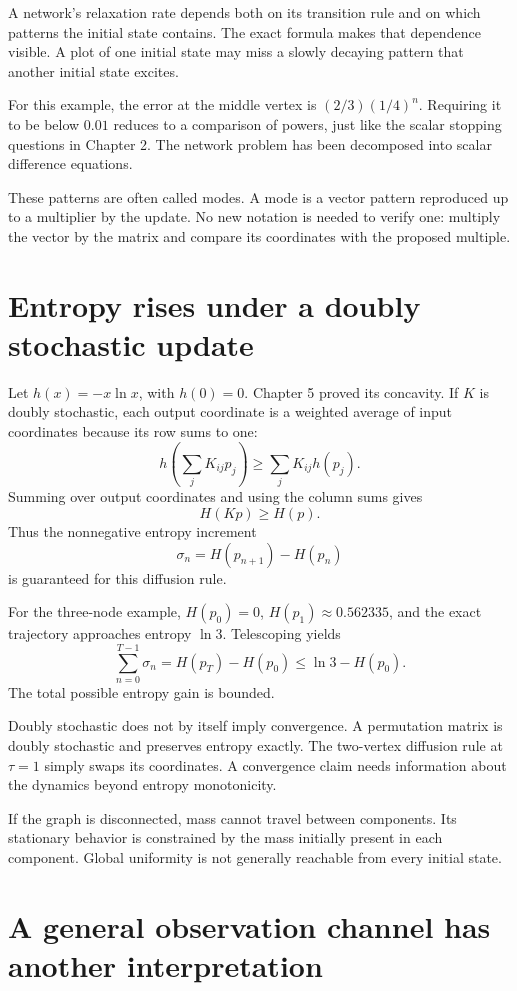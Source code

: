 \documentclass[11pt,oneside,openany]{book}
\theoremstyle{definition}
\theoremstyle{remark}
\numberwithin{equation}{chapter}
\begin{document}
A network's relaxation rate depends both on its transition rule and on which patterns the initial state contains. The exact formula makes that dependence visible. A plot of one initial state may miss a slowly decaying pattern that another initial state excites.

For this example, the error at the middle vertex is \((2/3)(1/4)^n\). Requiring it to be below \(0.01\) reduces to a comparison of powers, just like the scalar stopping questions in Chapter 2. The network problem has been decomposed into scalar difference equations.

These patterns are often called modes. A mode is a vector pattern reproduced up to a multiplier by the update. No new notation is needed to verify one: multiply the vector by the matrix and compare its coordinates with the proposed multiple.

\section{Entropy rises under a doubly stochastic update}\label{ch10-entropy-rises-under-a-doubly-stochastic-update}

Let \(h(x)=-x\ln x\), with \(h(0)=0\). Chapter 5 proved its concavity. If \(K\) is doubly stochastic, each output coordinate is a weighted average of input coordinates because its row sums to one: \[h\left(\sum_jK_{ij}p_j\right)\geq\sum_jK_{ij}h(p_j).\] Summing over output coordinates and using the column sums gives \[\boxed{H(Kp)\geq H(p).}\] Thus the nonnegative entropy increment \[\sigma_n=H(p_{n+1})-H(p_n)\] is guaranteed for this diffusion rule.

For the three-node example, \(H(p_0)=0\), \(H(p_1)\approx0.562335\), and the exact trajectory approaches entropy \(\ln3\). Telescoping yields \[\sum_{n=0}^{T-1}\sigma_n=H(p_T)-H(p_0)\leq\ln3-H(p_0).\] The total possible entropy gain is bounded.

Doubly stochastic does not by itself imply convergence. A permutation matrix is doubly stochastic and preserves entropy exactly. The two-vertex diffusion rule at \(\tau=1\) simply swaps its coordinates. A convergence claim needs information about the dynamics beyond entropy monotonicity.

If the graph is disconnected, mass cannot travel between components. Its stationary behavior is constrained by the mass initially present in each component. Global uniformity is not generally reachable from every initial state.

\section{A general observation channel has another interpretation}\label{ch10-a-general-observation-channel-has-another-interpretation}
\end{document}
